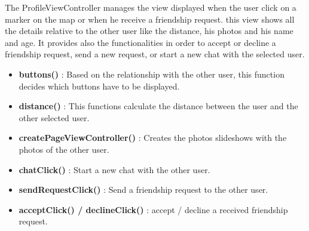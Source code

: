 The ProfileViewController manages the view displayed when the user click on a marker on the map or when he receive a friendship request. this view shows all the details relative to the other user like the distance, his photos and his name and age. It provides also the functionalities in order to accept or decline a friendship request, send a new request, or start a new chat with the selected user.

\begin{itemize}
\item \textbf{buttons()} : Based on the relationship with the other user, this function decides which buttons have to be displayed.
\item \textbf{distance()} : This functions calculate the distance between the user and the other selected user.
\item \textbf{createPageViewController()} : Creates the photos slideshows with the photos of the other user.
\item \textbf{chatClick()} : Start a new chat with the other user.
\item \textbf{sendRequestClick()} : Send a friendship request to the other user.
\item \textbf{acceptClick() / declineClick()} : accept / decline a received friendship request.
\end{itemize}



